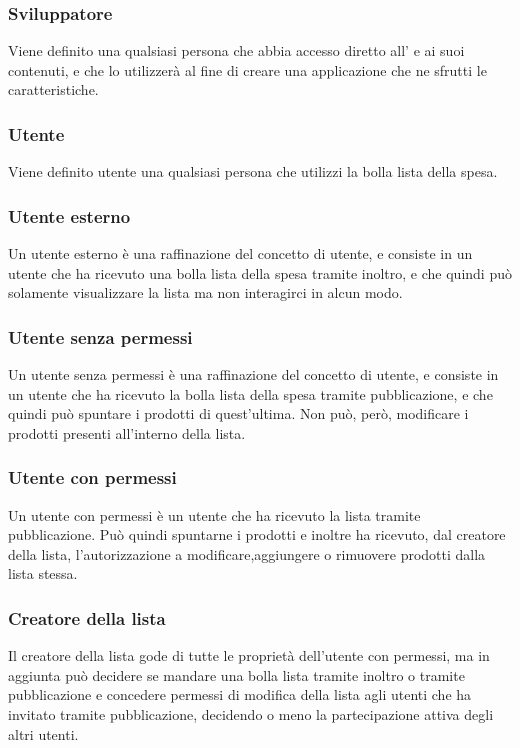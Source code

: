 \subsubsection{Sviluppatore}
Viene definito  una qualsiasi persona che abbia accesso diretto all' e ai suoi contenuti, e che lo utilizzerà al fine di creare una applicazione che ne sfrutti le caratteristiche.

\subsubsection{Utente}
Viene definito utente una qualsiasi persona che utilizzi la bolla lista della spesa.
\subsubsection{Utente esterno}
Un utente esterno è una raffinazione del concetto di utente, e consiste in un utente che ha ricevuto una bolla lista della spesa tramite inoltro, e che quindi può solamente visualizzare la lista ma non interagirci in alcun modo.
\subsubsection{Utente senza permessi}
Un utente senza permessi è una raffinazione del concetto di utente, e consiste in un utente che ha ricevuto la bolla lista della spesa tramite pubblicazione, e che quindi può spuntare i prodotti di quest'ultima. Non può, però, modificare i prodotti presenti all'interno della lista.
\subsubsection{Utente con permessi}
Un utente con permessi è un utente che ha ricevuto la lista tramite pubblicazione. Può quindi spuntarne i prodotti e inoltre ha ricevuto, dal creatore della lista, l'autorizzazione a modificare,aggiungere o rimuovere prodotti dalla lista stessa.
\subsubsection{Creatore della lista}
Il creatore della lista gode di tutte le proprietà dell'utente con permessi, ma in aggiunta può decidere se mandare una bolla lista tramite inoltro o tramite pubblicazione e concedere permessi di modifica della lista agli utenti che ha invitato tramite pubblicazione, decidendo o meno la partecipazione attiva degli altri utenti.



